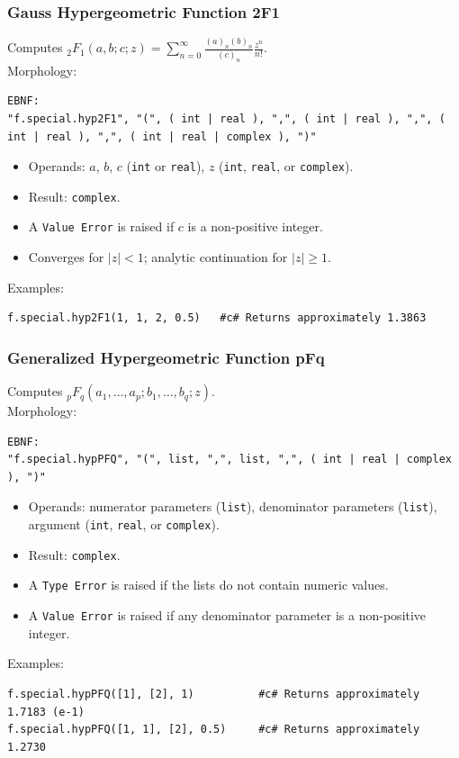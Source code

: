 \subsubsection{Gauss Hypergeometric Function 2F1}
Computes ${}_2F_1(a, b; c; z) = \sum_{n=0}^{\infty} \frac{(a)_n (b)_n}{(c)_n} \frac{z^n}{n!}$. \\
Morphology:
\begin{verbatim}
EBNF:
"f.special.hyp2F1", "(", ( int | real ), ",", ( int | real ), ",", ( int | real ), ",", ( int | real | complex ), ")"
\end{verbatim}
\begin{itemize}
\item Operands: $a$, $b$, $c$ (\texttt{int} or \texttt{real}), $z$ (\texttt{int}, \texttt{real}, or \texttt{complex}).
\item Result: \texttt{complex}.
\item A \texttt{Value Error} is raised if $c$ is a non-positive integer.
\item Converges for $|z| < 1$; analytic continuation for $|z| \geq 1$.
\end{itemize}
Examples:
\begin{verbatim}
f.special.hyp2F1(1, 1, 2, 0.5)   #c# Returns approximately 1.3863
\end{verbatim}

\subsubsection{Generalized Hypergeometric Function pFq}
Computes ${}_pF_q(a_1, \ldots, a_p; b_1, \ldots, b_q; z)$. \\
Morphology:
\begin{verbatim}
EBNF:
"f.special.hypPFQ", "(", list, ",", list, ",", ( int | real | complex ), ")"
\end{verbatim}
\begin{itemize}
\item Operands: numerator parameters (\texttt{list}), denominator parameters (\texttt{list}), argument (\texttt{int}, \texttt{real}, or \texttt{complex}).
\item Result: \texttt{complex}.
\item A \texttt{Type Error} is raised if the lists do not contain numeric values.
\item A \texttt{Value Error} is raised if any denominator parameter is a non-positive integer.
\end{itemize}
Examples:
\begin{verbatim}
f.special.hypPFQ([1], [2], 1)          #c# Returns approximately 1.7183 (e-1)
f.special.hypPFQ([1, 1], [2], 0.5)     #c# Returns approximately 1.2730
\end{verbatim}

